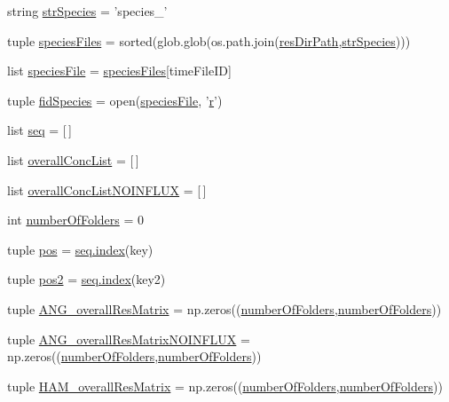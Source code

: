 \begin{DoxyCompactItemize}
\item 
string \hyperlink{a00097_ac1f05e7db61bcc83ea1ed27460462202}{str\-Species} = 'species\-\_\-'
\item 
tuple \hyperlink{a00097_a18645475f8596346ca431e99661b5674}{species\-Files} = sorted(glob.\-glob(os.\-path.\-join(\hyperlink{a00097_a28ca19f0f566396ef664e068a41a2837}{res\-Dir\-Path},\hyperlink{a00097_ac1f05e7db61bcc83ea1ed27460462202}{str\-Species})))
\item 
list \hyperlink{a00097_a3c620554bbf7ae30d97a60565fea8d1e}{species\-File} = \hyperlink{a00097_a18645475f8596346ca431e99661b5674}{species\-Files}\mbox{[}time\-File\-I\-D\mbox{]}
\item 
tuple \hyperlink{a00097_a70d70b9ab98e722475b03465c7f8dbbe}{fid\-Species} = open(\hyperlink{a00097_a3c620554bbf7ae30d97a60565fea8d1e}{species\-File}, '\hyperlink{a00031_ac862e7284527eb913b1351c8bfb8e079}{r}')
\item 
list \hyperlink{a00097_a1bdf98839177836f238806755e46ac3c}{seq} = \mbox{[}$\,$\mbox{]}
\item 
list \hyperlink{a00097_a2cebadd75179c46e551a2facbdd2741b}{overall\-Conc\-List} = \mbox{[}$\,$\mbox{]}
\item 
list \hyperlink{a00097_ad7eab833592c6cd395f9e2416dd13920}{overall\-Conc\-List\-N\-O\-I\-N\-F\-L\-U\-X} = \mbox{[}$\,$\mbox{]}
\item 
int \hyperlink{a00097_a3a2fe097086bb0f4a505fca8f53dc2b0}{number\-Of\-Folders} = 0
\item 
tuple \hyperlink{a00097_aa39692272363cd6f687c4b2a53f96594}{pos} = \hyperlink{a00060_a0cd6a44ffb07342cbc7e5ac33bfc9495}{seq.\-index}(key)
\item 
tuple \hyperlink{a00097_a49fec7e1deea4728b5ef4a487d155de9}{pos2} = \hyperlink{a00060_a0cd6a44ffb07342cbc7e5ac33bfc9495}{seq.\-index}(key2)
\item 
tuple \hyperlink{a00097_a15adfffa273548845cea67d8b89f0bb1}{A\-N\-G\-\_\-overall\-Res\-Matrix} = np.\-zeros((\hyperlink{a00097_a3a2fe097086bb0f4a505fca8f53dc2b0}{number\-Of\-Folders},\hyperlink{a00097_a3a2fe097086bb0f4a505fca8f53dc2b0}{number\-Of\-Folders}))
\item 
tuple \hyperlink{a00097_a7b0e67be0cf8de69432bdf56919d9e33}{A\-N\-G\-\_\-overall\-Res\-Matrix\-N\-O\-I\-N\-F\-L\-U\-X} = np.\-zeros((\hyperlink{a00097_a3a2fe097086bb0f4a505fca8f53dc2b0}{number\-Of\-Folders},\hyperlink{a00097_a3a2fe097086bb0f4a505fca8f53dc2b0}{number\-Of\-Folders}))
\item 
tuple \hyperlink{a00097_a5e8d5d65865736555e76c3f04058ddd9}{H\-A\-M\-\_\-overall\-Res\-Matrix} = np.\-zeros((\hyperlink{a00097_a3a2fe097086bb0f4a505fca8f53dc2b0}{number\-Of\-Folders},\hyperlink{a00097_a3a2fe097086bb0f4a505fca8f53dc2b0}{number\-Of\-Folders}))

\end{DoxyCompactItemize}
